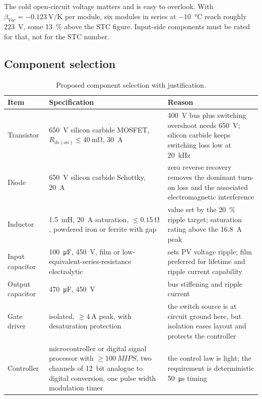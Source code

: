 The cold open-circuit voltage matters and is easy to overlook. With
$\beta_{Voc} = \SI{-0.123}{\volt\per\kelvin}$ per module, six modules in series
at \SI{-10}{\celsius} reach roughly \SI{223}{\volt}, some \SI{13}{\percent}
above the STC figure. Input-side components must be rated for that, not for the
STC number.

\subsection{Component selection}

\begin{table}[htbp]
\centering
\caption{Proposed component selection with justification.}
\label{tab:bom}
\begin{tabular}{@{}L{0.20\textwidth}L{0.30\textwidth}L{0.42\textwidth}@{}}
\toprule
\textbf{Item} & \textbf{Specification} & \textbf{Reason} \\
\midrule
Transistor & \SI{650}{\volt} silicon carbide MOSFET, $R_{ds(on)} \le \SI{40}{\milli\ohm}$, \SI{30}{\ampere} & \SI{400}{\volt} bus plus switching overshoot needs \SI{650}{\volt}; silicon carbide keeps switching loss low at \SI{20}{\kilo\hertz} \\
Diode & \SI{650}{\volt} silicon carbide Schottky, \SI{20}{\ampere} & zero reverse recovery removes the dominant turn-on loss and the associated electromagnetic interference \\
Inductor & \SI{1.5}{\milli\henry}, \SI{20}{\ampere} saturation, $\le \SI{0.15}{\ohm}$, powdered iron or ferrite with gap & value set by the \SI{20}{\percent} ripple target; saturation rating above the \SI{16.8}{\ampere} peak \\
Input capacitor & \SI{100}{\micro\farad}, \SI{450}{\volt}, film or low-equivalent-series-resistance electrolytic & sets PV voltage ripple; film preferred for lifetime and ripple current capability \\
Output capacitor & \SI{470}{\micro\farad}, \SI{450}{\volt} & bus stiffening and ripple current \\
Gate driver & isolated, $\ge \SI{4}{\ampere}$ peak, with desaturation protection & the switch source is at circuit ground here, but isolation eases layout and protects the controller \\
Controller & microcontroller or digital signal processor with $\ge \SI{100}{MIPS}$, two channels of \SI{12}{bit} analogue to digital conversion, one pulse width modulation timer & the control law is light; the requirement is deterministic \SI{50}{\micro\second} timing \\
\bottomrule
\end{tabular}
\end{table}

